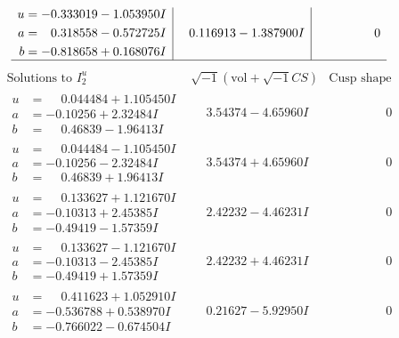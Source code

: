 \documentclass[1p]{elsarticle_modified}
\theoremstyle{definition}
\newcommand{\I}{\sqrt{-1}}
\begin{document}
$$\begin{array}{c|c|c}
\begin{aligned}
u &= -0.333019 - 1.053950 I \\
a &= \phantom{-}0.318558 - 0.572725 I \\
b &= -0.818658 + 0.168076 I\end{aligned}
 & \phantom{-}0.116913 - 1.387900 I & \phantom{-0.000000 } 0\\
 \hline 
 \end{array}$$\newpage$$\begin{array}{c|c|c}  
\text{Solutions to }I^u_{2}& \I (\text{vol} + \sqrt{-1}CS) & \text{Cusp shape}\\
 \hline 
\begin{aligned}
u &= \phantom{-}0.044484 + 1.105450 I \\
a &= -0.10256 + 2.32484 I \\
b &= \phantom{-}0.46839 - 1.96413 I\end{aligned}
 & \phantom{-}3.54374 - 4.65960 I & \phantom{-0.000000 } 0 \\ \hline\begin{aligned}
u &= \phantom{-}0.044484 - 1.105450 I \\
a &= -0.10256 - 2.32484 I \\
b &= \phantom{-}0.46839 + 1.96413 I\end{aligned}
 & \phantom{-}3.54374 + 4.65960 I & \phantom{-0.000000 } 0 \\ \hline\begin{aligned}
u &= \phantom{-}0.133627 + 1.121670 I \\
a &= -0.10313 + 2.45385 I \\
b &= -0.49419 - 1.57359 I\end{aligned}
 & \phantom{-}2.42232 - 4.46231 I & \phantom{-0.000000 } 0 \\ \hline\begin{aligned}
u &= \phantom{-}0.133627 - 1.121670 I \\
a &= -0.10313 - 2.45385 I \\
b &= -0.49419 + 1.57359 I\end{aligned}
 & \phantom{-}2.42232 + 4.46231 I & \phantom{-0.000000 } 0 \\ \hline\begin{aligned}
u &= \phantom{-}0.411623 + 1.052910 I \\
a &= -0.536788 + 0.538970 I \\
b &= -0.766022 - 0.674504 I\end{aligned}
 & \phantom{-}0.21627 - 5.92950 I & \phantom{-0.000000 } 0 \\ \hline\begin{aligned}

\end{aligned}
\end{array}$$
\end{document}
